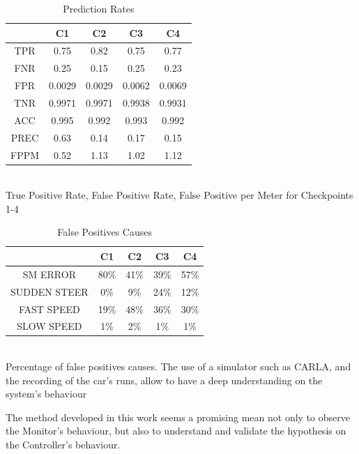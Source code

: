 \vspace{0.5cm}
\begin{table}[h]
	\caption{Prediction Rates}
	\begin{center}
		\begin{tabular}{ |c|c|c|c|c| }
			\hline
			  & C1 & C2 & C3 & C4 \\
			\hline
			TPR & 0.75 & 0.82 & 0.75 & 0.77 \\
			\hline
			FNR & 0.25 & 0.15 & 0.25 & 0.23 \\
			\hline
			FPR & 0.0029 & 0.0029 & 0.0062 & 0.0069 \\
			\hline
			TNR & 0.9971 & 0.9971 & 0.9938 & 0.9931 \\
			\hline
			ACC & 0.995 & 0.992 & 0.993 & 0.992 \\
			\hline
			PREC & 0.63 & 0.14 & 0.17 & 0.15 \\
			\hline
			FPPM & 0.52 & 1.13 & 1.02 & 1.12 \\
			\hline
		\end{tabular}
	\\
	\vspace{0.3cm}
	True Positive Rate, False Positive Rate, False Positive per Meter for Checkpoints 1-4
	\end{center}
\end{table}

\begin{table}
	\caption{False Positives Causes}
	\begin{center}
		\begin{tabular}{ |c|c|c|c|c| }
			\hline
			  & C1 & C2 & C3 & C4 \\
			\hline
			SM ERROR & 80\% & 41\% & 39\% & 57\% \\
			\hline
			SUDDEN STEER & 0\% & 9\% & 24\% & 12\% \\
			\hline
			FAST SPEED & 19\% & 48\% & 36\% & 30\% \\
			\hline
			SLOW SPEED & 1\% & 2\% & 1\% & 1\% \\
			\hline
		\end{tabular}
	\\
	\vspace{0.3cm}
	Percentage of false positives causes. The use of a simulator such as CARLA, and the recording of the car's runs, allow to have a deep understanding on the system's behaviour
	\end{center}
\end{table}

The method developed in this work seems a promising mean not only to observe the Monitor's behaviour, but also to understand and validate the hypothesis on the Controller's behaviour.

